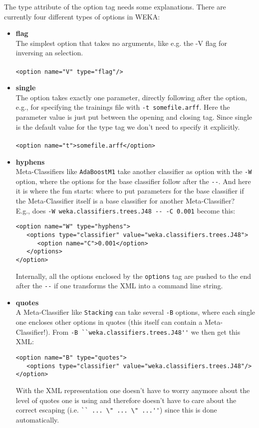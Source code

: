 \noindent The type attribute of the option tag needs some
explanations. There are currently four different types of options in
WEKA:

\begin{itemize}
\item \textbf{flag}\\
The simplest option that takes no arguments, like e.g. the -V flag for inversing an selection.\\\\
\verb^<option name="V" type="flag"/>^
\item \textbf{single}\\ 
The option takes exactly one parameter,
  directly following after the option, e.g., for specifying the
  trainings file with \verb=-t somefile.arff=. Here the parameter value is
  just put between the opening and closing tag. Since single is the
  default value for the type tag we don't need to specify it
  explicitly.\\\\
\verb^<option name="t">somefile.arff</option>^
\newpage
\item \textbf{hyphens}\\
Meta-Classifiers like \verb=AdaBoostM1= take another classifier as option
with the \verb=-W= option, where the options for the base classifier follow
after the \verb=--=. And here it is where the fun starts: where to put
parameters for the base classifier if the Meta-Classifier itself is a
base classifier for another Meta-Classifier?\\

E.g., does \verb=-W weka.classifiers.trees.J48 -- -C 0.001= become this:
\begin{verbatim}
<option name="W" type="hyphens">
   <options type="classifier" value="weka.classifiers.trees.J48">
      <option name="C">0.001</option>
   </options>
</option>
\end{verbatim}

\noindent Internally, all the options enclosed by the \verb=options= tag are
pushed to the end after the \verb=--= if one transforms the XML into a
command line string.

\item \textbf{quotes}\\
A Meta-Classifier like \verb=Stacking= can take several \verb=-B= options, where
each single one encloses other options in quotes (this itself can
contain a Meta-Classifier!). From \verb=-B ``weka.classifiers.trees.J48''= we
then get this XML:\\
\begin{verbatim}
<option name="B" type="quotes">
   <options type="classifier" value="weka.classifiers.trees.J48"/>
</option>
\end{verbatim}

\noindent With the XML representation one doesn't have to worry
anymore about the level of quotes one is using and therefore doesn't
have to care about the correct escaping (i.e. \verb=`` ... \" ... \" ...''=)
since this is done automatically.
\end{itemize}

